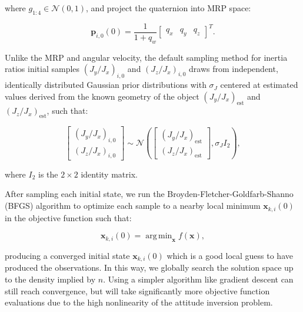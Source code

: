 \documentclass[a4paper,twocolumn]{spaceDebrisC} %
\newcommand{\vctr}[1]{\bm{#1}}
\DeclareMathOperator*{\argmin}{arg\,min}
\begin{document}
\noindent
where $g_{1:4} \in \mathcal{N}(0,1)$, and project the quaternion into MRP space:

\begin{equation} \label{eq:mrp_sampler}
  \vctr{p}_{i,0}(0) = \frac{1}{1 + q_w} \begin{bmatrix} q_x & q_y & q_z \end{bmatrix}^T.
\end{equation}

Unlike the MRP and angular velocity, the default sampling method for inertia ratios initial samples $\left(J_y / J_x\right)_{i,0}$ and $\left(J_z / J_x\right)_{i,0}$ draws from independent, identically distributed Gaussian prior distributions with $\sigma_J$ centered at estimated values derived from the known geometry of the object $\left(J_y / J_x\right)_\text{est}$ and $\left(J_z / J_x\right)_\text{est}$, such that:

\begin{equation}
  \begin{bmatrix}
    \left(J_y / J_x\right)_{i,0} \\ \left(J_z / J_x\right)_{i,0}
  \end{bmatrix} \sim \mathcal{N} \left(\begin{bmatrix}
    \left(J_y / J_x\right)_\text{est} \\
    \left(J_z / J_x\right)_\text{est} \end{bmatrix}, \sigma_J I_2 \right),
\end{equation}

\noindent
where $I_2$ is the $2\times2$ identity matrix.

After sampling each initial state, we run the Broyden-Fletcher-Goldfarb-Shanno (BFGS) algorithm \cite{broyden1970, fletcher1970, goldfarb1970, shanno1970} to optimize each sample to a nearby local minimum $\vctr{x}_{k,i}(0)$ in the objective function such that:

\begin{equation} \label{eq:opt_problem}
 \vctr{x}_{k,i}(0) = \argmin_{\vctr{x}} f(\vctr{x}),
\end{equation}

\noindent
producing a converged initial state $\vctr{x}_{k,i}(0)$ which is a good local guess to have produced the observations. In this way, we globally search the solution space up to the density implied by $n$. Using a simpler algorithm like gradient descent can still reach convergence, but will take significantly more objective function evaluations due to the high nonlinearity of the attitude inversion problem.
\end{document}
